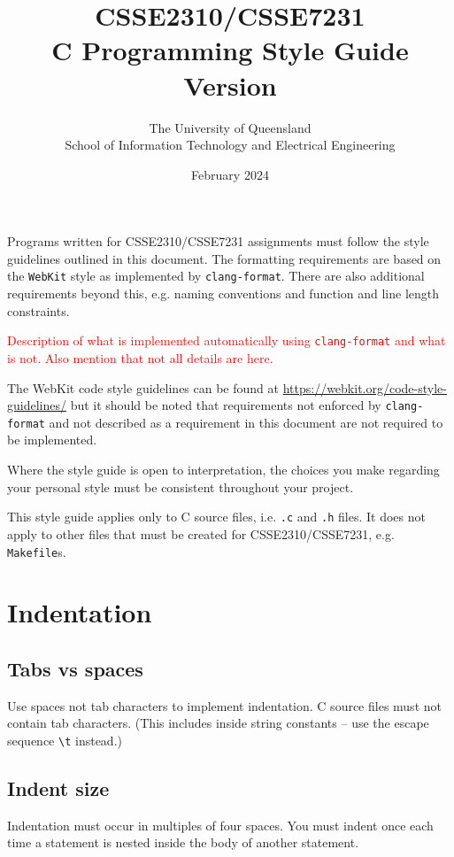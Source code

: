 \documentclass{article}
\title{CSSE2310/CSSE7231\\C Programming Style Guide\\Version \versionNum}
\author{The University of Queensland\\School of Information Technology and Electrical Engineering}
\date{February 2024}
\begin{document}
\maketitle
\thispagestyle{plain}
\linenumbers

\lstset{numbers=left, numberstyle=\ttfamily}

Programs written for CSSE2310/CSSE7231 assignments must follow the style guidelines outlined in this document. The formatting requirements are based on the \texttt{WebKit} style as implemented by \texttt{clang-format}. There are also
additional requirements beyond this, e.g. naming conventions and function and line length constraints. 

\textcolor{red}{Description of what is implemented automatically using \texttt{clang-format} and what is not. Also mention that not all details are here.}

The WebKit code style guidelines can be found at \url{https://webkit.org/code-style-guidelines/} but it should be
noted that requirements not enforced by \texttt{clang-format} and not described as a requirement in this document
are not required to be implemented.

Where the style guide is open to interpretation, the choices you make regarding your personal style 
must be consistent throughout your project.

This style guide applies only to C source files, i.e. \texttt{.c} and \texttt{.h} files. It does not apply to other files
that must be created for CSSE2310/CSSE7231, e.g. \texttt{Makefile}s. 

\section{Indentation}
\subsection{Tabs vs spaces}
Use spaces not tab characters to implement indentation. C source files must not contain tab characters. (This includes
inside string constants -- use the escape sequence \texttt{\textbackslash t} instead.)

\subsection{Indent size}
Indentation must occur in multiples of four spaces. You must indent once each time a statement is nested inside the
body of another statement.
\end{document}
